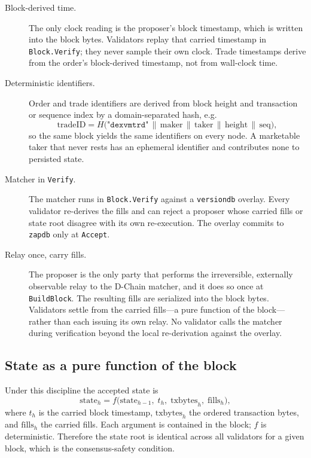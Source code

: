 \begin{description}
  \item[Block-derived time.] The only clock reading is the proposer's block timestamp,
  which is written into the block bytes. Validators replay that carried timestamp in
  \texttt{Block.Verify}; they never sample their own clock. Trade timestamps derive from
  the order's block-derived timestamp, not from wall-clock time.
  \item[Deterministic identifiers.] Order and trade identifiers are derived from block
  height and transaction or sequence index by a domain-separated hash, e.g.
  \[
    \mathrm{tradeID} = H\big(\texttt{"dexvmtrd"} \,\|\, \mathrm{maker} \,\|\, \mathrm{taker}
      \,\|\, \mathrm{height} \,\|\, \mathrm{seq}\big),
  \]
  so the same block yields the same identifiers on every node. A marketable taker that
  never rests has an ephemeral identifier and contributes none to persisted state.
  \item[Matcher in \texttt{Verify}.] The matcher runs in \texttt{Block.Verify} against a
  \texttt{versiondb} overlay. Every validator re-derives the fills and can reject a
  proposer whose carried fills or state root disagree with its own re-execution. The
  overlay commits to \texttt{zapdb} only at \texttt{Accept}.
  \item[Relay once, carry fills.] The proposer is the only party that performs the
  irreversible, externally observable relay to the D-Chain matcher, and it does so once at
  \texttt{BuildBlock}. The resulting fills are serialized into the block bytes. Validators
  settle from the carried fills---a pure function of the block---rather than each issuing
  its own relay. No validator calls the matcher during verification beyond the local
  re-derivation against the overlay.
\end{description}

\subsection{State as a pure function of the block}

Under this discipline the accepted state is
\[
  \mathrm{state}_{h} = f\big(\mathrm{state}_{h-1},\; t_{h},\; \mathrm{txbytes}_{h},\;
    \mathrm{fills}_{h}\big),
\]
where $t_{h}$ is the carried block timestamp, $\mathrm{txbytes}_{h}$ the ordered
transaction bytes, and $\mathrm{fills}_{h}$ the carried fills. Each argument is contained
in the block; $f$ is deterministic. Therefore the state root is identical across all
validators for a given block, which is the consensus-safety condition.

